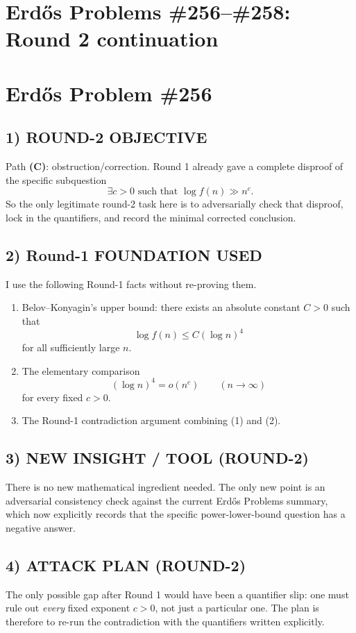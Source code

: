 \section*{Erd\H{o}s Problems \#256--\#258: Round 2 continuation}

\section*{Erd\H{o}s Problem \#256}

\subsection*{1) ROUND-2 OBJECTIVE}
Path \textbf{(C)}: obstruction/correction. Round 1 already gave a complete disproof of the specific subquestion
\[
\exists c>0\text{ such that }\log f(n)\gg n^c.
\]
So the only legitimate round-2 task here is to adversarially check that disproof, lock in the quantifiers, and record the minimal corrected conclusion.

\subsection*{2) Round-1 FOUNDATION USED}
I use the following Round-1 facts without re-proving them.
\begin{enumerate}
\item Belov--Konyagin's upper bound: there exists an absolute constant $C>0$ such that
\[
\log f(n)\le C(\log n)^4
\]
for all sufficiently large $n$.
\item The elementary comparison
\[
(\log n)^4=o(n^c)\qquad (n\to\infty)
\]
for every fixed $c>0$.
\item The Round-1 contradiction argument combining (1) and (2).
\end{enumerate}

\subsection*{3) NEW INSIGHT / TOOL (ROUND-2)}
There is no new mathematical ingredient needed. The only new point is an adversarial consistency check against the current Erd\H{o}s Problems summary, which now explicitly records that the specific power-lower-bound question has a negative answer.

\subsection*{4) ATTACK PLAN (ROUND-2)}
The only possible gap after Round 1 would have been a quantifier slip: one must rule out \emph{every} fixed exponent $c>0$, not just a particular one. The plan is therefore to re-run the contradiction with the quantifiers written explicitly.

